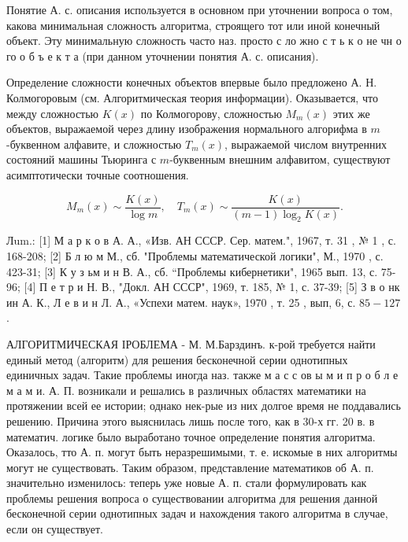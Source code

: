 \documentclass[10pt]{article}
\begin{document}
Понятие А. с. описания используется в основном при уточнении вопроса о том, какова минимальная сложность алгоритма, строящего тот или иной конечный объект. Эту минимальную сложность часто наз. просто с ло жно с т ь к о не чн о го о б ъ е к т а (при данном уточнении понятия А. с. описания).



Определение сложности конечных объектов впервые было предложено А. Н. Колмогоровым (см. Алгоритмическая теория информации). Оказывается, что между сложностью $K(x)$ по Колмогорову, сложностью $M_{m}(x)$ этих же объектов, выражаемой через длину изображения нормального алгорифма в $m$-буквенном алфавите, и сложностью $T_{m}(x)$, выражаемой числом внутренних состояний машины Тьюринга с $m$-буквенным внешним алфавитом, существуют асимптотически точные соотношения.



\[

M_{m}(x) \sim \frac{K(x)}{\log m}, \quad T_{m}(x) \sim \frac{K(x)}{(m-1) \log _{2} K(x)} .

\]



Лum.: [1] М а р к о в А. А., «Изв. АН СССР. Сер. матем.", 1967, т. 31 , № 1 , с. 168-208; [2] Б л ю м М., сб. "Проблемы математической логики", М., 1970 , с. 423-31; [3] К у з ьм и н В. А., сб. “Проблемы кибернетики", 1965 вып. 13, с. 75-96; [4] П е т р и Н. В., "Докл. АН СССР", 1969, т. 185, № 1, с. 37-39; [5] З в о нк ин А. К., Л е в и н Л. А., «Успехи матем. наук», 1970 , т. 25 , вып, 6, с. $85-127$.



АЛГОРИТМИЧЕСКАЯ ІРОБЛЕМА - М. М.Барздинъ. к-рой требуется найти единый метод (алгоритм) для решения бесконечной серии однотипных единичных задач. Такие проблемы иногда наз. также м а с с ов ы м и п р о б л е м а м и. А. П. возникали и решались в различных областях математики на протяжении всей ее истории; однако нек-рые из них долгое время не поддавались решению. Причина этого выяснилась лишь после того, как в 30-х гг. 20 в. в математич. логике было выработано точное определение понятия алгоритма. Оказалось, тто А. п. могут быть неразрешимыми, т. е. искомые в них алгоритмы могут не существовать. Таким образом, представление математиков об А. п. значительно изменилось: теперь уже новые А. п. стали формулировать как проблемы решения вопроса о существовании алгоритма для решения данной бесконечной серии однотипных задач и нахождения такого алгоритма в случае, если он существует.
\end{document}
